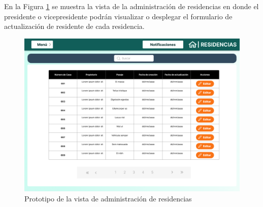 En la Figura \ref{fig:residencias} se muestra la vista de la administración de residencias en donde el presidente o vicepresidente podrán visualizar o desplegar el formulario de actualización de residente de cada residencia.

\begin{figure}[H]
    \centering
    \includegraphics[width=1\textwidth]{resources/images/residencias}
    \caption{Prototipo de la vista de administración de residencias}
    \label{fig:residencias}
\end{figure}


